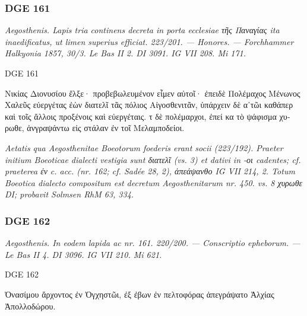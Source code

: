 \hrulefill

\subsubsection{DGE 161}
\textit{Aegosthenis. Lapis tria continens decreta in porta ecclesiae \textgreek{τῆς Παναγίας} ita inaedificatus, ut limen superius efficiat. 223/201. — Honores. — Forchhammer Halkyonia 1857, 30/3. Le Bas II 2. DI 3091. IG VII 208. Mi 171.}
\begin{versi}{DGE 161}
\begin{greek}
Νικίας Διονυσίου ἔλξε· προβεβωλευμένον εἶμεν αὐτοῖ· ἐπειδὲ Πολέμαχος Μένωνος Χαλεῦς εὐεργέτας ἐὼν διατελῖ {\verso} τᾶς πόλιος Αἰγοσθενιτᾶν, ὑπάρχειν δὲ α᾽τῶι καθάπερ {\verso} καὶ τοῖς ἄλλοις προξένοις καὶ εὐεργέταις. τ δὲ πολέμαρχοι, ἐπεί κα τὸ ψάφισμα χυρωθε, {\verso} ἀνγραψάντω εἰς στάλαν ἐν τοῖ Μελαμποδείοι.
\end{greek}
\end{versi}
\textit{Aetatis qua Aegosthenitae Boeotorum foederis erant socii (223/192). Praeter initium Boeoticae dialecti vestigia sunt \textgreek{διατελῖ} (vs. 3) et dativi in \textgreek{-οι} cadentes; cf. praeterea \textgreek{ἐν} c. acc. (nr. 162; cf. Sadée 28, 2), \textgreek{ἀπεάψανθο} IG VII 214, 2. Totum Boeotica dialecto compositum est decretum Aegosthenitarum nr. 450. vs. 8 \textgreek{χυρωθε} DI; probavit Solmsen RhM 63, 334.}

\hrulefill

\subsubsection{DGE 162}
\textit{Aegosthenis. In eodem lapida ac nr. 161. 220/200. — Conscriptio epheborum. — Le Bas II 4. DI 3096. IG VII 210. Mi 621.}
\begin{versi}{DGE 162}
\begin{greek}
Ὀνασίμου ἄρχοντος ἐν Ὀγχηστῶι, ἐξ ἐβων ἐν πελτοφόρας ἀπεγράψατο Ἀλχίας {\verso} Ἀπολλοδώρου.
\end{greek}
\end{versi}

\hrulefill

